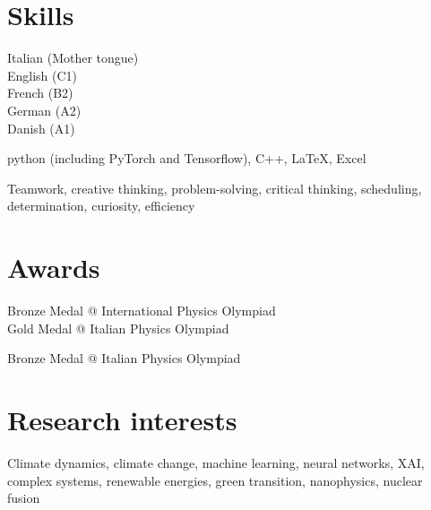 \documentclass[11pt, a4 paper]{article}
\begin{document}


\section*{Skills}
  \begin{description}[style=multiline,leftmargin=3cm,align=right]
    \item[Languages]
      Italian (Mother tongue) \\
      English (C1) \\
      French (B2) \\
      German (A2) \\
      Danish (A1)
    \item[Software]
      python (including PyTorch and Tensorflow), C++, LaTeX, Excel
    \item[Transversal]
      Teamwork, creative thinking, problem-solving, critical thinking, scheduling, determination, curiosity, efficiency
  \end{description}


\section*{Awards}
  \begin{description}[style=multiline,leftmargin=3cm,align=right]
    \item[2016]
      Bronze Medal @ International Physics Olympiad \\
      Gold Medal @ Italian Physics Olympiad
    \item[2015] Bronze Medal @ Italian Physics Olympiad
  \end{description}


\section*{Research interests}
  \begin{description}[style=multiline,leftmargin=3cm,align=right]
    \item[] Climate dynamics, climate change, machine learning, neural networks, XAI, complex systems, renewable energies, green transition, nanophysics, nuclear fusion
  \end{description}
\end{document}
